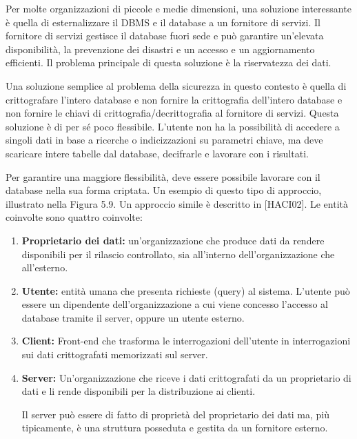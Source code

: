 Per molte organizzazioni di piccole e medie dimensioni, una soluzione interessante è quella di esternalizzare il DBMS e il database a un fornitore di servizi. Il fornitore di servizi gestisce il database fuori sede e può garantire un'elevata disponibilità, la prevenzione dei disastri e un accesso e un aggiornamento efficienti. Il problema principale di questa soluzione è la riservatezza dei dati.

\singlespacing

Una soluzione semplice al problema della sicurezza in questo contesto è quella di crittografare l'intero database e non fornire la crittografia dell'intero database e non fornire le chiavi di crittografia/decrittografia al fornitore di servizi. Questa soluzione è di per sé poco flessibile. L'utente non ha la possibilità di accedere a singoli dati in base a ricerche o indicizzazioni su parametri chiave, ma deve scaricare intere tabelle dal database, decifrarle e lavorare con i risultati. 

\singlespacing

Per garantire una maggiore flessibilità, deve essere possibile lavorare con il database nella sua forma criptata. Un esempio di questo tipo di approccio, illustrato nella Figura 5.9. Un approccio simile è descritto in [HACI02]. Le entità coinvolte sono quattro coinvolte:

\begin{enumerate}
    \item \textbf{Proprietario dei dati:} un'organizzazione che produce dati da rendere disponibili per il rilascio controllato, sia all'interno dell'organizzazione che all'esterno.
    
    \item  \textbf{Utente:} entità umana che presenta richieste (query) al sistema. L'utente può essere un dipendente dell'organizzazione a cui viene concesso l'accesso al database tramite il server, oppure un utente esterno.
    
    \item \textbf{Client:} Front-end che trasforma le interrogazioni dell'utente in interrogazioni sui dati crittografati memorizzati sul server.
    
    \item \textbf{Server:} Un'organizzazione che riceve i dati crittografati da un proprietario di dati e li rende disponibili per la distribuzione ai clienti.
    
    Il server può essere di fatto di proprietà del proprietario dei dati ma, più tipicamente, è una struttura posseduta e gestita da un fornitore esterno. 
\end{enumerate}

